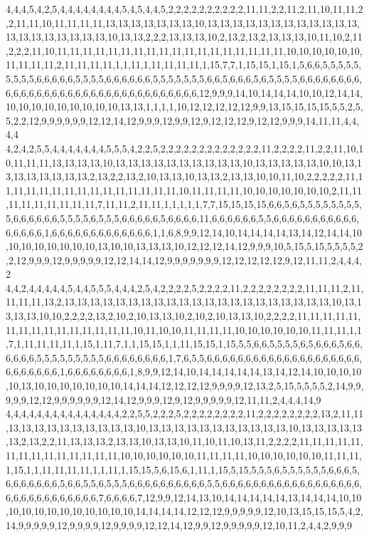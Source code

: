 4,4,4,5,4,2,5,4,4,4,4,4,4,4,4,5,4,5,4,4,5,2,2,2,2,2,2,2,2,2,2,11,11,2,2,11,2,11,10,11,11,2,2,11,11,10,11,11,11,11,13,13,13,13,13,13,13,10,13,13,13,13,13,13,13,13,13,13,13,13,13,13,13,13,13,13,13,13,10,13,13,2,2,2,13,13,13,10,2,13,2,13,2,13,13,13,10,11,10,2,11,2,2,2,11,10,11,11,11,11,11,11,11,11,11,11,11,11,11,11,11,11,11,11,10,10,10,10,10,10,11,11,11,11,2,11,11,11,11,1,1,11,1,11,11,11,11,1,15,7,7,1,15,15,1,15,1,5,6,6,5,5,5,5,5,5,5,5,5,6,6,6,6,6,5,5,5,5,6,6,6,6,6,6,5,5,5,5,5,5,5,6,6,5,6,6,6,5,6,5,5,5,5,6,6,6,6,6,6,6,6,6,6,6,6,6,6,6,6,6,6,6,6,6,6,6,6,6,6,6,6,6,6,6,6,6,12,9,9,9,14,10,14,14,14,10,10,12,14,14,10,10,10,10,10,10,10,10,10,13,13,1,1,1,1,10,12,12,12,12,12,9,9,13,15,15,15,15,5,5,2,5,5,2,2,12,9,9,9,9,9,9,12,12,14,12,9,9,9,12,9,9,12,9,12,12,12,9,12,12,9,9,9,14,11,11,4,4,4,4
4,2,4,2,5,5,4,4,4,4,4,4,4,5,5,5,4,2,2,5,2,2,2,2,2,2,2,2,2,2,2,2,2,11,2,2,2,2,11,2,2,11,10,10,11,11,11,13,13,13,13,10,13,13,13,13,13,13,13,13,13,13,10,13,13,13,13,13,10,10,13,13,13,13,13,13,13,13,2,13,2,2,13,2,10,13,13,10,13,13,2,13,13,10,10,11,10,2,2,2,2,2,11,11,11,11,11,11,11,11,11,11,11,11,11,11,11,10,11,11,11,11,10,10,10,10,10,10,10,2,11,11,11,11,11,11,11,11,11,7,11,11,2,11,11,1,1,1,1,1,7,7,15,15,15,15,6,6,5,6,5,5,5,5,5,5,5,5,5,6,6,6,6,6,6,5,5,5,5,6,5,5,5,6,6,6,6,6,5,6,6,6,6,11,6,6,6,6,6,6,5,5,6,6,6,6,6,6,6,6,6,6,6,6,6,6,6,6,1,6,6,6,6,6,6,6,6,6,6,6,6,6,1,1,6,8,9,9,12,14,10,14,14,14,14,13,14,12,14,14,10,10,10,10,10,10,10,10,13,10,10,13,13,13,10,12,12,12,14,12,9,9,9,10,5,15,5,15,5,5,5,5,2,2,12,9,9,9,12,9,9,9,9,9,12,12,14,14,12,9,9,9,9,9,9,9,12,12,12,12,12,9,12,11,11,2,4,4,4,2
4,4,2,4,4,4,4,4,5,4,4,5,5,5,4,4,4,2,5,4,2,2,2,2,5,2,2,2,2,11,2,2,2,2,2,2,2,2,11,11,11,2,11,11,11,11,13,2,13,13,13,13,13,13,13,13,13,13,13,13,13,13,13,13,13,13,13,13,13,10,13,13,13,13,10,10,2,2,2,2,13,2,10,2,10,13,13,10,2,10,2,10,13,13,10,2,2,2,2,11,11,11,11,11,11,11,11,11,11,11,11,11,11,11,10,11,10,10,11,11,11,11,10,10,10,10,10,10,11,11,11,1,1,7,1,11,11,11,11,1,15,1,11,7,1,1,15,15,1,1,11,15,15,1,15,5,5,6,6,5,5,5,5,6,5,6,6,6,5,6,6,6,6,6,6,5,5,5,5,5,5,5,5,5,6,6,6,6,6,6,6,6,1,7,6,5,5,6,6,6,6,6,6,6,6,6,6,6,6,6,6,6,6,6,6,6,6,6,6,6,6,6,6,6,1,6,6,6,6,6,6,6,6,1,8,9,9,12,14,10,14,14,14,14,14,13,14,12,14,10,10,10,10,10,13,10,10,10,10,10,10,10,14,14,14,12,12,12,12,9,9,9,9,12,13,2,5,15,5,5,5,5,2,14,9,9,9,9,9,12,12,9,9,9,9,9,9,12,14,12,9,9,9,12,9,12,9,9,9,9,9,12,11,11,2,4,4,4,14,9
4,4,4,4,4,4,4,4,4,4,4,4,4,4,4,2,2,5,5,2,2,2,5,2,2,2,2,2,2,2,2,11,2,2,2,2,2,2,2,2,13,2,11,11,13,13,13,13,13,13,13,13,13,13,10,13,13,13,13,13,13,13,13,13,13,13,10,13,13,13,13,13,13,2,13,2,2,11,13,13,13,2,13,13,10,13,13,10,11,10,11,10,13,11,2,2,2,2,11,11,11,11,11,11,11,11,11,11,11,11,11,11,10,10,10,10,10,10,11,11,11,11,10,10,10,10,10,10,11,11,11,1,15,1,1,11,11,11,11,1,1,11,1,15,15,5,6,15,6,1,11,1,15,5,15,5,5,5,6,5,5,5,5,5,5,6,6,6,5,6,6,6,6,6,6,6,5,6,6,5,5,6,5,5,5,6,6,6,6,6,6,6,6,6,6,5,5,6,6,6,6,6,6,6,6,6,6,6,6,6,6,6,6,6,6,6,6,6,6,6,6,6,6,6,6,6,6,7,6,6,6,6,7,12,9,9,12,14,13,10,14,14,14,14,14,13,14,14,14,10,10,10,10,10,10,10,10,10,10,10,10,14,14,14,14,12,12,12,9,9,9,9,9,12,10,13,15,15,15,5,4,2,14,9,9,9,9,9,12,9,9,9,9,12,9,9,9,9,12,12,14,12,9,9,12,9,9,9,9,9,12,10,11,2,4,4,2,9,9,9
